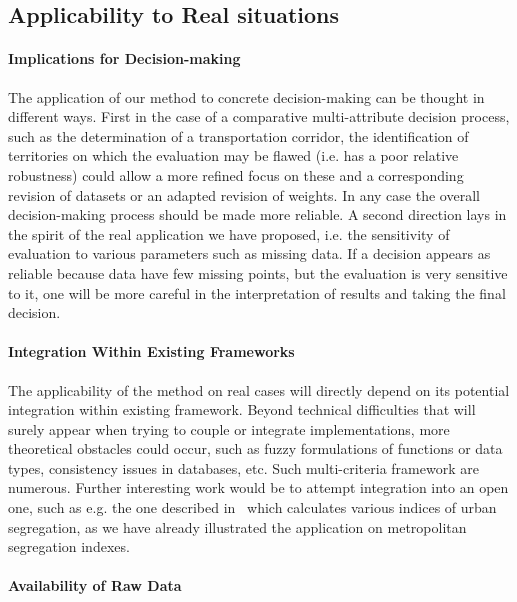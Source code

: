 \documentclass[runningheads,a4paper]{llncs2e/llncs}
\begin{document}
\subsection{Applicability to Real situations}


\paragraph{Implications for Decision-making}

The application of our method to concrete decision-making can be thought in different ways. First in the case of a comparative multi-attribute decision process, such as the determination of a transportation corridor, the identification of territories on which the evaluation may be flawed (i.e. has a poor relative robustness) could allow a more refined focus on these and a corresponding revision of datasets or an adapted revision of weights. In any case the overall decision-making process should be made more reliable. A second direction lays in the spirit of the real application we have proposed, i.e. the sensitivity of evaluation to various parameters such as missing data. If a decision appears as reliable because data have few missing points, but the evaluation is very sensitive to it, one will be more careful in the interpretation of results and taking the final decision.

\paragraph{Integration Within Existing Frameworks}

The applicability of the method on real cases will directly depend on its potential integration within existing framework. Beyond technical difficulties that will surely appear when trying to couple or integrate implementations, more theoretical obstacles could occur, such as fuzzy formulations of functions or data types, consistency issues in databases, etc. Such multi-criteria framework are numerous. Further interesting work would be to attempt integration into an open one, such as e.g. the one described in~\cite{tivadar2014oasis} which calculates various indices of urban segregation, as we have already illustrated the application on metropolitan segregation indexes.


\paragraph{Availability of Raw Data}
\end{document}
